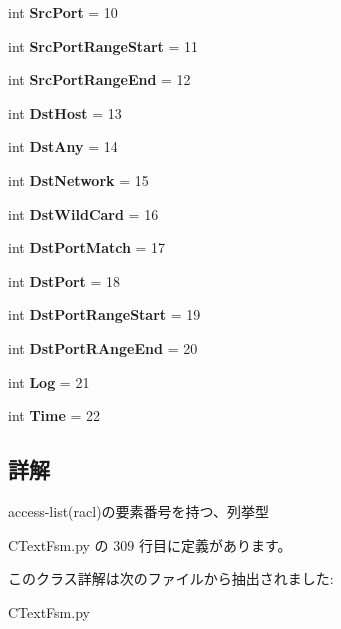 \begin{DoxyCompactItemize}
int {\bfseries Src\+Port} = 10
\item 
\mbox{\label{classCTextFsm_1_1eRacl_a9233c268f17454e8281ce47ac07e87f3}} 
int {\bfseries Src\+Port\+Range\+Start} = 11
\item 
\mbox{\label{classCTextFsm_1_1eRacl_a1cca9d2ba48513a8b9dc0c68d6cddeee}} 
int {\bfseries Src\+Port\+Range\+End} = 12
\item 
\mbox{\label{classCTextFsm_1_1eRacl_aa17233cf62db4e44c1e881bf508d8177}} 
int {\bfseries Dst\+Host} = 13
\item 
\mbox{\label{classCTextFsm_1_1eRacl_a76cda9589fa02bd66bb23297a3c8eb95}} 
int {\bfseries Dst\+Any} = 14
\item 
\mbox{\label{classCTextFsm_1_1eRacl_a2b2d307dff5b6f455b709bdefa0ced34}} 
int {\bfseries Dst\+Network} = 15
\item 
\mbox{\label{classCTextFsm_1_1eRacl_ad61374cd62a4e97f9cde0aa74877df14}} 
int {\bfseries Dst\+Wild\+Card} = 16
\item 
\mbox{\label{classCTextFsm_1_1eRacl_a3fb76b73cdfc630253bb2489eb9551f2}} 
int {\bfseries Dst\+Port\+Match} = 17
\item 
\mbox{\label{classCTextFsm_1_1eRacl_aa393f5661e8d374fea1f2a0d3b1f568b}} 
int {\bfseries Dst\+Port} = 18
\item 
\mbox{\label{classCTextFsm_1_1eRacl_ad348230e71e0060f065277babe8ebb51}} 
int {\bfseries Dst\+Port\+Range\+Start} = 19
\item 
\mbox{\label{classCTextFsm_1_1eRacl_a7d208e3158dea57ba3c7970a7f8666e0}} 
int {\bfseries Dst\+Port\+R\+Ange\+End} = 20
\item 
\mbox{\label{classCTextFsm_1_1eRacl_a10e0ff5af0a332b3b667a9830cce6a56}} 
int {\bfseries Log} = 21
\item 
\mbox{\label{classCTextFsm_1_1eRacl_a9a36cf041f5f5ae7eb62ceac08615b57}} 
int {\bfseries Time} = 22
\end{DoxyCompactItemize}


\subsection{詳解}
\begin{DoxyVerb}access-list(racl)の要素番号を持つ、列挙型
\end{DoxyVerb}
 

 C\+Text\+Fsm.\+py の 309 行目に定義があります。



このクラス詳解は次のファイルから抽出されました\+:\begin{DoxyCompactItemize}
\item 
C\+Text\+Fsm.\+py\end{DoxyCompactItemize}
